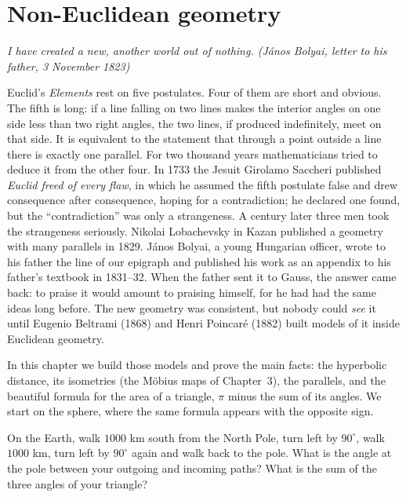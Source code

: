 \chapter{Non-Euclidean geometry}\label{ch:noneuclid}

\begin{center}\itshape
I have created a new, another world out of nothing.
\upshape(J\'anos Bolyai, letter to his father, 3 November 1823)
\end{center}

Euclid's \emph{Elements} rest on five postulates. Four of them are short and obvious. The fifth is long: if a line falling on two lines makes the interior
angles on one side less than two right angles, the two lines, if produced indefinitely, meet on that side. It is equivalent to the statement that through a
point outside a line there is exactly one parallel. For two thousand years mathematicians tried to deduce it from the other four. In 1733 the Jesuit
Girolamo Saccheri published \emph{Euclid freed of every flaw}, in which he assumed the fifth postulate false and drew consequence after consequence,
hoping for a contradiction; he declared one found, but the ``contradiction'' was only a strangeness. A century later three men took the strangeness
seriously. Nikolai Lobachevsky in Kazan published a geometry with many parallels in 1829. J\'anos Bolyai, a young Hungarian officer, wrote to his father
the line of our epigraph and published his work as an appendix to his father's textbook in 1831--32. When the father sent it to Gauss, the answer came
back: to praise it would amount to praising himself, for he had had the same ideas long before. The new geometry was consistent, but nobody could
\emph{see} it until Eugenio Beltrami (1868) and Henri Poincaré (1882) built models of it inside Euclidean geometry.

In this chapter we build those models and prove the main facts: the hyperbolic distance, its isometries (the M\"obius maps of Chapter~3), the
parallels, and the beautiful formula for the area of a triangle, $\pi$ minus the sum of its angles. We start on the sphere, where the same formula appears
with the opposite sign.

\begin{think}
On the Earth, walk $1000$ km south from the North Pole, turn left by $90^\circ$, walk $1000$ km, turn left by $90^\circ$ again and walk back to the pole.
What is the angle at the pole between your outgoing and incoming paths? What is the sum of the three angles of your triangle?
\end{think}

